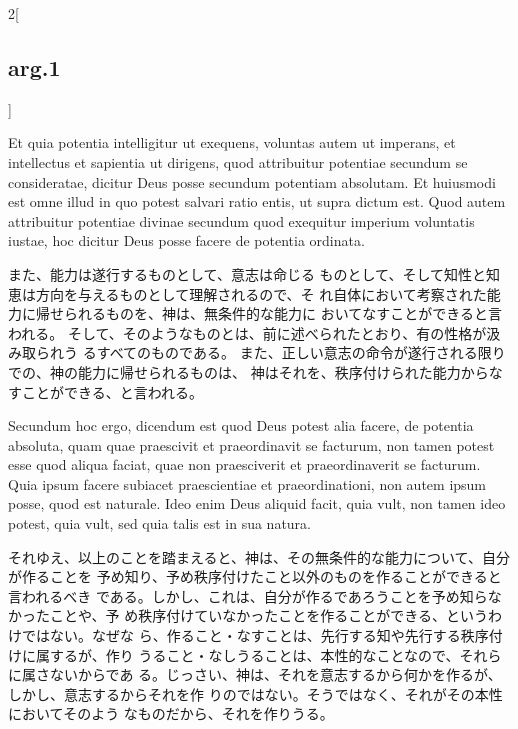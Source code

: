 \documentclass[paper=a4paper,fontsize=10pt,jafontsize=9pt,titlepage]{jlreq}
\begin{document}
\begin{paracol}{2}[\subsection{arg.1}]
\switchcolumn*

Et quia potentia intelligitur ut exequens,
voluntas autem ut imperans, et intellectus et sapientia ut dirigens,
quod attribuitur potentiae secundum se consideratae, dicitur Deus posse
secundum potentiam absolutam. Et huiusmodi est omne illud in quo potest
salvari ratio entis, ut supra dictum est.
 Quod autem attribuitur
potentiae divinae secundum quod exequitur imperium voluntatis iustae,
hoc dicitur Deus posse facere de potentia ordinata.

\switchcolumn

また、能力は遂行するものとして、意志は命じる
 ものとして、そして知性と知恵は方向を与えるものとして理解されるので、そ
 れ自体において考察された能力に帰せられるものを、神は、無条件的な能力に
 おいてなすことができると言われる。
そして、そのようなものとは、前に述べられたとおり、有の性格が汲み取られう
 るすべてのものである。
また、正しい意志の命令が遂行される限りでの、神の能力に帰せられるものは、
 神はそれを、秩序付けられた能力からなすことができる、と言われる。

\switchcolumn*

Secundum hoc ergo,
dicendum est quod Deus potest alia facere, de potentia absoluta, quam
quae praescivit et praeordinavit se facturum, non tamen potest esse quod
aliqua faciat, quae non praesciverit et praeordinaverit se
facturum. Quia ipsum facere subiacet praescientiae et praeordinationi,
non autem ipsum posse, quod est naturale. Ideo enim Deus aliquid facit,
quia vult, non tamen ideo potest, quia vult, sed quia talis est in sua
natura.

\switchcolumn

それゆえ、以上のことを踏まえると、神は、その無条件的な能力について、自分が作ることを
 予め知り、予め秩序付けたこと以外のものを作ることができると言われるべき
 である。しかし、これは、自分が作るであろうことを予め知らなかったことや、予
 め秩序付けていなかったことを作ることができる、というわけではない。なぜな
 ら、作ること・なすことは、先行する知や先行する秩序付けに属するが、作り
 うること・なしうることは、本性的なことなので、それらに属さないからであ
 る。じっさい、神は、それを意志するから何かを作るが、しかし、意志するからそれを作
 りのではない。そうではなく、それがその本性においてそのよう
 なものだから、それを作りうる。

\switchcolumn*[\subsection{ad.2}]


\end{paracol}
\end{document}
